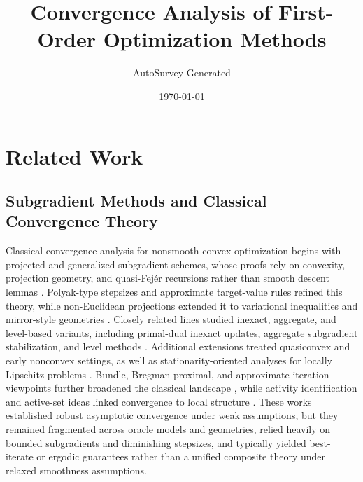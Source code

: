 \documentclass[11pt]{article}
\title{Convergence Analysis of First-Order Optimization Methods}
\author{AutoSurvey Generated}
\date{\today}
\begin{document}
\section{Related Work}

\subsection{Subgradient Methods and Classical Convergence Theory}
Classical convergence analysis for nonsmooth convex optimization begins with projected and generalized subgradient schemes, whose proofs rely on convexity, projection geometry, and quasi-Fej\'er recursions rather than smooth descent lemmas \citep{Alber_1998, Kim_1991, Br_nnlund_1995, Goffin_1977}. Polyak-type stepsizes and approximate target-value rules refined this theory, while non-Euclidean projections extended it to variational inequalities and mirror-style geometries \citep{Allen_1987, Auslender_2007}. Closely related lines studied inexact, aggregate, and level-based variants, including primal-dual inexact updates, aggregate subgradient stabilization, and level methods \citep{unknown1996primal, Kiwiel_1983, unknown1998convergence}. Additional extensions treated quasiconvex and early nonconvex settings, as well as stationarity-oriented analyses for locally Lipschitz problems \citep{Kiwiel_2001, Mifflin_1984, Mifflin_1990, Lemarechal_1982}. Bundle, Bregman-proximal, and approximate-iteration viewpoints further broadened the classical landscape \citep{Eckstein_1998, unknown1998bundle, Kiwiel_1995}, while activity identification and active-set ideas linked convergence to local structure \citep{Fl_m_1992, Panier_1987, Tseng_2007}. These works established robust asymptotic convergence under weak assumptions, but they remained fragmented across oracle models and geometries, relied heavily on bounded subgradients and diminishing stepsizes, and typically yielded best-iterate or ergodic guarantees rather than a unified composite theory under relaxed smoothness assumptions.
\end{document}
